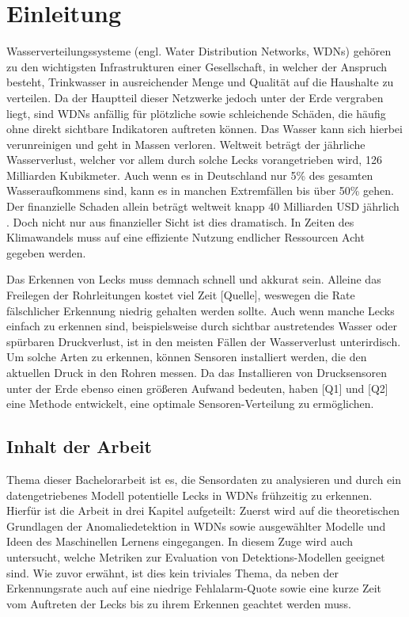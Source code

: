 \chapter{Einleitung}

Wasserverteilungssysteme (engl. Water Distribution Networks, WDNs) gehören zu den wichtigsten Infrastrukturen
 einer Gesellschaft, in welcher der Anspruch besteht, Trinkwasser in ausreichender Menge und Qualität auf die
 Haushalte zu verteilen. Da der Hauptteil dieser Netzwerke jedoch unter der Erde vergraben liegt, sind WDNs
 anfällig für plötzliche sowie schleichende Schäden, die häufig ohne direkt sichtbare Indikatoren
 auftreten können. Das Wasser kann sich hierbei verunreinigen und geht in Massen verloren. Weltweit beträgt
 der jährliche Wasserverlust, welcher vor allem durch solche Lecks vorangetrieben wird, 126 Milliarden
 Kubikmeter. Auch wenn es in Deutschland nur 5\% des gesamten Wasseraufkommens sind, kann es in manchen
 Extremfällen bis über 50\% gehen. Der finanzielle Schaden allein beträgt weltweit knapp 40 Milliarden USD
 jährlich \cite{breakData}. Doch nicht nur aus finanzieller Sicht ist dies dramatisch. In Zeiten des Klimawandels
 muss auf eine effiziente Nutzung endlicher Ressourcen Acht gegeben werden.

Das Erkennen von Lecks muss demnach schnell und akkurat sein. Alleine das Freilegen der Rohrleitungen kostet viel
 Zeit [Quelle], weswegen die Rate fälschlicher Erkennung niedrig gehalten werden sollte. Auch wenn manche Lecks
 einfach zu erkennen sind, beispielsweise durch sichtbar austretendes Wasser oder spürbaren Druckverlust, ist in
 den meisten Fällen der Wasserverlust unterirdisch. Um solche Arten zu erkennen, können Sensoren installiert
 werden, die den aktuellen Druck in den Rohren messen. Da das Installieren von Drucksensoren unter der Erde
 ebenso einen größeren Aufwand bedeuten, haben [Q1] und [Q2] eine Methode entwickelt, eine optimale
 Sensoren-Verteilung zu ermöglichen.

\section*{Inhalt der Arbeit}

Thema dieser Bachelorarbeit ist es, die Sensordaten zu analysieren und durch ein datengetriebenes Modell
 potentielle Lecks in WDNs frühzeitig zu erkennen. Hierfür ist die Arbeit in drei Kapitel aufgeteilt:
 Zuerst wird auf die theoretischen Grundlagen der Anomaliedetektion in WDNs sowie ausgewählter Modelle und
 Ideen des Maschinellen Lernens eingegangen.
In diesem Zuge wird auch untersucht, welche Metriken zur Evaluation von Detektions-Modellen geeignet sind.
Wie zuvor erwähnt, ist dies kein triviales Thema, da neben der Erkennungsrate auch auf eine niedrige
 Fehlalarm-Quote sowie eine kurze Zeit vom Auftreten der Lecks bis zu ihrem Erkennen geachtet werden muss.


